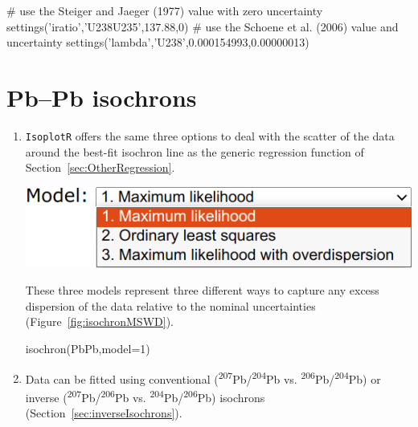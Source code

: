 \begin{refsection}
\begin{script}
# use the Steiger and Jaeger (1977) value with zero uncertainty
settings('iratio','U238U235',137.88,0)
# use the Schoene et al. (2006) value and uncertainty
settings('lambda','U238',0.000154993,0.00000013) 
\end{script}

\section{Pb--Pb isochrons}\label{sec:PbPb-isochrons-R}

\begin{enumerate}

\item \texttt{IsoplotR} offers the same three options to deal with the
  scatter of the data around the best-fit isochron line as the generic
  regression function of Section~\ref{sec:OtherRegression}.

\noindent\begin{minipage}[t]{.45\linewidth}
\strut\vspace*{-\baselineskip}\newline
\includegraphics[width=\linewidth]{../figures/PbPbIsochronModels.png}
\end{minipage}
\begin{minipage}[t]{.55\linewidth}
  These three models represent three different ways to capture any
  excess dispersion of the data relative to the nominal uncertainties
  (Figure~\ref{fig:isochronMSWD}).
\end{minipage}

\begin{console}
isochron(PbPb,model=1)
\end{console}

\item Data can be fitted using conventional
  (\textsuperscript{207}Pb/\textsuperscript{204}Pb
  vs. \textsuperscript{206}Pb/\textsuperscript{204}Pb) or inverse
  (\textsuperscript{207}Pb/\textsuperscript{206}Pb
  vs. \textsuperscript{204}Pb/\textsuperscript{206}Pb) isochrons
  (Section~\ref{sec:inverseIsochrons}).


\end{enumerate}
\end{refsection}
